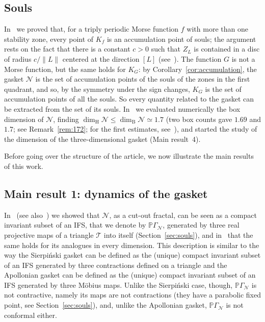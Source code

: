 \documentclass[11pt]{amsart}
\theoremstyle{definition}
\theoremstyle{remark}
\newcommand{\cN}{\mathcal N}
\newcommand{\cT}{\mathcal T}
\newcommand{\PGN}{{\mathbb P}\Gamma_{\mathcal N}}
\newcommand{\dimH}{\dim_{\mathrm H}}
\newcommand{\dimB}{\dim_{\mathrm B}}
\begin{document}
\subsection*{Souls}
In~\cite{DL03} we proved that, for a triply periodic Morse function $f$ with more than one stability zone, every point of $K_f$ is an accumulation point of souls; the argument rests on the fact that there is a constant $c>0$ such that $Z_L$ is contained in a disc of radius $c/\|L\|$ centered at the direction $[L]$ (see~\cite{DL05}).
The function $G$ is not a Morse function, but the same holds for $K_G$: by Corollary~\ref{cor:accumulation}, the gasket $\cN$ is the set of accumulation points of the souls of the zones in the first quadrant, and so, by the symmetry under the sign changes, $K_G$ is the set of accumulation points of all the souls. So every quantity related to the gasket can be extracted from the set of its souls.
In~\cite{DL08} we evaluated numerically the box dimension of $\cN$, finding $\dimH\cN\le\dimB\cN\simeq1.7$ (two box counts gave $1.69$ and $1.7$; see Remark~\ref{rem:172}; for the first estimates, see~\cite{DD07,DD09}), and started the study of the dimension of the three-dimensional gasket (Main result~4).

\medskip
Before going over the structure of the article, we now illustrate the main results of this work. 

\subsection*{Main result 1: dynamics of the gasket}

In~\cite{DD07,DL08} (see also~\cite{DL15JGA,DL15EM}) we showed that $\cN$, as a cut-out fractal, can be seen as a compact invariant subset of an IFS, that we denote by $\PGN$, generated by three real projective maps of a triangle $\cT$ into itself (Section~\ref{sec:souls}), and in~\cite[Prop.~2]{DL08} that the same holds for its analogues in every dimension. This description is similar
to the way the Sierpi\'nski gasket can be defined as the (unique) compact invariant subset of an IFS generated by three contractions defined on a triangle and the Apollonian gasket can be defined as the (unique) compact invariant subset of an IFS generated by three M\"obius maps.
Unlike the Sierpi\'nski case, though, $\PGN$ is not contractive, namely its maps are not contractions (they have a parabolic fixed point, see Section~\ref{sec:souls}), and, unlike the Apollonian gasket, $\PGN$ is not conformal either.
\end{document}
